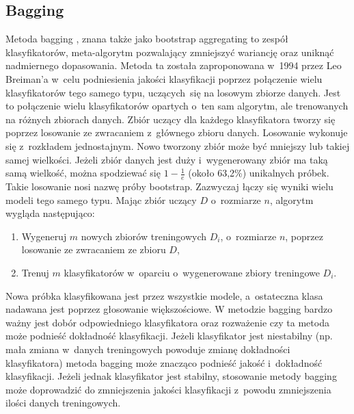 \subsection{Bagging}
Metoda bagging \cite{baggingc}, znana także jako bootstrap aggregating to zespół klasyfikatorów, meta-algorytm pozwalający zmniejszyć wariancję oraz uniknąć nadmiernego dopasowania. Metoda ta została zaproponowana w 1994 przez Leo Breiman’a w celu podniesienia jakości klasyfikacji poprzez połączenie wielu klasyfikatorów tego samego typu, uczących się na losowym zbiorze danych. Jest to połączenie wielu klasyfikatorów opartych o~ten sam algorytm, ale trenowanych na różnych zbiorach danych. Zbiór uczący dla każdego klasyfikatora tworzy się poprzez losowanie ze zwracaniem z~głównego zbioru danych. Losowanie wykonuje się z~rozkładem jednostajnym. Nowo tworzony zbiór może być mniejszy lub takiej samej wielkości. Jeżeli zbiór danych jest duży i~wygenerowany zbiór ma taką samą wielkość, można spodziewać się $1-\frac{1}{e}$ (około 63,2\%) unikalnych próbek. Takie losowanie nosi nazwę próby bootstrap. Zazwyczaj łączy się wyniki wielu modeli tego samego typu. Mając zbiór uczący $D$ o~rozmiarze $n$, algorytm wygląda następująco:
\begin{enumerate}
	\item Wygeneruj $m$ nowych zbiorów treningowych $D_i$, o~rozmiarze $n$, poprzez losowanie ze zwracaniem ze zbioru $D$,
	\item Trenuj $m$ klasyfikatorów w~oparciu o~wygenerowane zbiory treningowe $D_i$.	
\end{enumerate}
Nowa próbka klasyfikowana jest przez wszystkie modele, a~ostateczna klasa nadawana jest poprzez głosowanie większościowe.
W metodzie bagging bardzo ważny jest dobór odpowiedniego klasyfikatora oraz rozważenie czy ta metoda może podnieść dokładność klasyfikacji. Jeżeli klasyfikator jest niestabilny (np. mała zmiana w danych treningowych powoduje zmianę dokładności klasyfikatora) metoda bagging może znacząco podnieść jakość i dokładność klasyfikacji. Jeżeli jednak klasyfikator jest stabilny, stosowanie metody bagging może doprowadzić do zmniejszenia jakości klasyfikacji z powodu zmniejszenia ilości danych treningowych.
